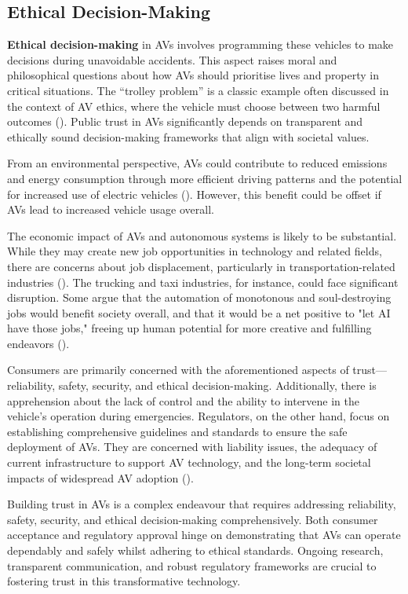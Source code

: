 \subsection{Ethical Decision-Making}
\textbf{Ethical decision-making} in AVs involves programming these vehicles to make decisions during unavoidable accidents. This aspect raises moral and philosophical questions about how AVs should prioritise lives and property in critical situations. The ``trolley problem'' is a classic example often discussed in the context of AV ethics, where the vehicle must choose between two harmful outcomes (\cite{lin2016}). Public trust in AVs significantly depends on transparent and ethically sound decision-making frameworks that align with societal values.

From an environmental perspective, AVs could contribute to reduced emissions and energy consumption through more efficient driving patterns and the potential for increased use of electric vehicles (\cite{Greenblatt2015}). However, this benefit could be offset if AVs lead to increased vehicle usage overall.

The economic impact of AVs and autonomous systems is likely to be substantial. While they may create new job opportunities in technology and related fields, there are concerns about job displacement, particularly in transportation-related industries (\cite{Autor2015}). The trucking and taxi industries, for instance, could face significant disruption. Some argue that the automation of monotonous and soul-destroying jobs would benefit society overall, and that it would be a net positive to "let AI have those jobs," freeing up human potential for more creative and fulfilling endeavors (\cite{Picone2025}).

Consumers are primarily concerned with the aforementioned aspects of trust—reliability, safety, security, and ethical decision-making. Additionally, there is apprehension about the lack of control and the ability to intervene in the vehicle's operation during emergencies. Regulators, on the other hand, focus on establishing comprehensive guidelines and standards to ensure the safe deployment of AVs. They are concerned with liability issues, the adequacy of current infrastructure to support AV technology, and the long-term societal impacts of widespread AV adoption (\cite{litman2020}).

Building trust in AVs is a complex endeavour that requires addressing reliability, safety, security, and ethical decision-making comprehensively. Both consumer acceptance and regulatory approval hinge on demonstrating that AVs can operate dependably and safely whilst adhering to ethical standards. Ongoing research, transparent communication, and robust regulatory frameworks are crucial to fostering trust in this transformative technology.

